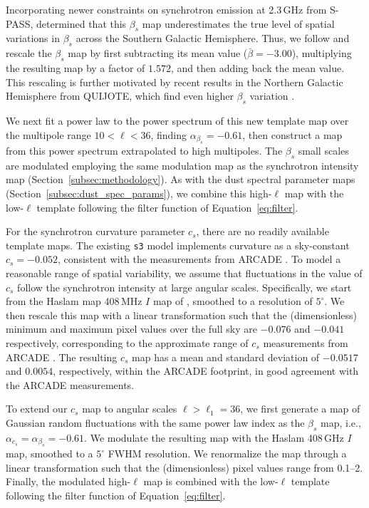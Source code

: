 \documentclass[twocolumn]{aastex631}
\begin{document}
Incorporating newer constraints on synchrotron emission at 2.3\,GHz from S-PASS, \citet{Krachmalnicoff:2018} determined that this $\beta_s$ map underestimates the true level of spatial variations in $\beta_s$ across the Southern Galactic Hemisphere. Thus, we follow \citet{Krachmalnicoff:2018} and rescale the $\beta_s$ map by first subtracting its mean value ($\bar{\beta} = -3.00$), multiplying the resulting map by a factor of $1.572$, and then adding back the mean value. This rescaling is further motivated by recent results in the Northern Galactic Hemisphere from QUIJOTE, which find even higher $\beta_s$ variation \citep{delaHoz:2023, Rubino-Martin:2023}. 

We next fit a power law to the power spectrum of this new template map over the multipole range $10 < \ell < 36$, finding $\alpha_{\beta_s}=-0.61$, then construct a map from this power spectrum extrapolated to high multipoles. The $\beta_s$ small scales are modulated employing the same modulation map as the synchrotron intensity map (Section~\ref{subsec:methodology}). As with the dust spectral parameter maps (Section~\ref{subsec:dust_spec_params}), we combine this high-$\ell$ map with the low-$\ell$ template following the filter function of Equation~\ref{eq:filter}.
 
For the synchrotron curvature parameter $c_s$, there are no readily available template maps. The existing \texttt{s3} model implements curvature as a sky-constant $c_s = -0.052$, consistent with the measurements from ARCADE \citep[$c_s=-0.052 \pm 0.005$,][]{Kogut:2012}. To model a reasonable range of spatial variability, we assume that fluctuations in the value of $c_s$ follow the synchrotron intensity at large angular scales. Specifically, we start from the Haslam map 408\,MHz $I$ map of \citet{Remazeilles:2015}, smoothed to a resolution of $5^\circ$. We then rescale this map with a linear transformation such that the (dimensionless) minimum and maximum pixel values over the full sky are $-0.076$ and $-0.041$ respectively, corresponding to the approximate range of $c_s$ measurements from ARCADE \citep[][Figure~6]{Kogut:2012}. The resulting $c_s$ map has a mean and standard deviation of $-0.0517$ and $0.0054$, respectively, within the ARCADE footprint, in good agreement with the ARCADE measurements.

To extend our $c_s$ map to angular scales $\ell > \ell_1 = 36$, we first generate a map of Gaussian random fluctuations with the same power law index as the $\beta_s$ map, i.e., $\alpha _{c_s}=\alpha _{\beta_s} = -0.61$. We modulate the resulting map with the Haslam 408\,GHz $I$ map, smoothed to a $5^\circ$ FWHM resolution. We renormalize the map through a linear transformation such that the (dimensionless) pixel values range from 0.1--2. Finally, the modulated high-$\ell$ map is combined with the low-$\ell$ template following the filter function of Equation~\ref{eq:filter}.
\end{document}
